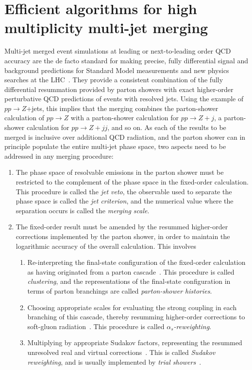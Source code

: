 \documentclass[aps,prd,twocolumn,fleqn,superscriptaddress,groupedaddress,nofootinbib,preprintnumbers]{revtex4}
\begin{document}
\section{Efficient algorithms for high multiplicity multi-jet merging}
\label{sec:tech_intro}
Multi-jet merged event simulations at leading or next-to-leading order
QCD accuracy are the de facto standard for making precise, fully differential
signal and background predictions for Standard Model measurements and
new physics searches at the LHC~\cite{Buckley:2011ms}.
They provide a consistent combination of the fully differential resummation
provided by parton showers with exact higher-order perturbative QCD predictions
of events with resolved jets. Using the example of $pp\to Z$+jets, this implies
that the merging combines the parton-shower calculation of $pp\to Z$ with a
parton-shower calculation for $pp\to Z+j$, a
parton-shower calculation for $pp\to Z+jj$, and so on. As each of the results
to be merged is inclusive over additional QCD radiation, and the parton shower
can in principle populate the entire multi-jet phase space, two aspects
need to be addressed in any merging procedure:
\begin{enumerate}
\item The phase space of resolvable emissions in the parton shower must be restricted
  to the complement of the phase space in the fixed-order calculation. This procedure
  is called the {\it jet veto}, the observable used to separate the phase space
  is called the {\it jet criterion}, and the numerical value where the separation
  occurs is called the {\it merging scale}.
\item\label{step:meps_reweight_n_veto}
  The fixed-order result must be amended by the resummed higher-order
  corrections implemented by the parton shower, in order to maintain the
  logarithmic accuracy of the overall calculation. This involves
  \begin{enumerate}
  \item Re-interpreting the final-state configuration of the fixed-order calculation
    as having originated from a parton cascade~\cite{Andre:1997vh}. This procedure is called
    {\it clustering}, and the representations of the final-state configuration in terms of
    parton branchings are called {\it parton-shower histories}.
  \item Choosing appropriate scales for evaluating the strong coupling in each branching
    of this cascade, thereby resumming higher-order corrections to soft-gluon
    radiation~\cite{Amati:1980ch,Catani:1990rr}.
    This procedure is called {\it $\alpha_s$-reweighting}.
  \item Multiplying by appropriate Sudakov factors, representing the resummed unresolved
    real and virtual corrections~\cite{Catani:2001cc}. This is called
    {\it Sudakov reweighting}, and is usually implemented by
    {\it trial showers}~\cite{Lonnblad:2001iq}.
  \end{enumerate}
\end{enumerate}
\end{document}
